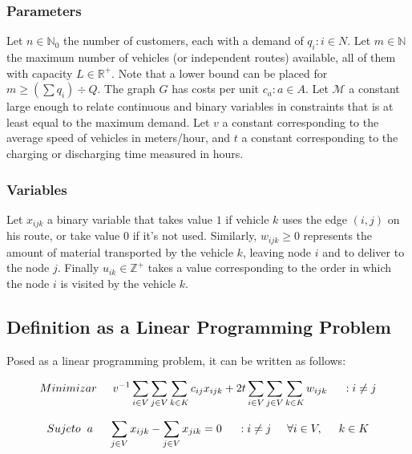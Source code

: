 \documentclass{amsart}
\begin{document}
        \subsubsection{Parameters}
        Let $n \in \mathbb{N}_0$ the number of customers, each with a demand of $q_i : i \in N$. Let $m \in \mathbb{N}$ the maximum number of vehicles (or independent routes) available, all of them with capacity $L \in \mathbb{R}^+$. Note that a lower bound can be placed for $m \geq (\sum q_i) \div Q$. The graph $G$ has costs per unit $c_{a} : a \in A$. Let $\mathcal{M}$ a constant large enough to relate continuous and binary variables in constraints that is at least equal to the maximum demand. Let $v$ a constant corresponding to the average speed of vehicles in meters/hour, and $t$ a constant corresponding to the charging or discharging time measured in hours.

        \subsubsection{Variables}
        Let $x_{ijk}$ a binary variable that takes value $1$ if vehicle $k$ uses the edge $(i, j)$ on his route, or take value $0$ if it's not used. Similarly, $w_{ijk} \geq 0$ represents the amount of material transported by the vehicle $k$, leaving node $i$ and to deliver to the node $j$. Finally $u_{ik} \in \mathbb{Z}^+$ takes a value corresponding to the order in which the node $i$ is visited by the vehicle $k$.

        \subsection{Definition as a Linear Programming Problem}
        Posed as a linear programming problem, it can be written as follows:
            
            \begin{equation}
                Minimizar \hspace{0.5cm} v^{-1} \sum_{i \in V} \sum_{j \in V} \sum_{k \in K} c_{ij} x_{ijk} + 2t \sum_{i \in V} \sum_{j \in V} \sum_{k \in K} w_{ijk} \hspace{0.5cm} : i \neq j
            \end{equation}

        \[Sujeto\hspace{0.2cm} a \hspace{0.5cm} \sum_{j \in V} x_{ijk} - \sum_{j \in V} x_{jik} = 0 \hspace{0.5cm} : i \neq j \hspace{0.5cm} \forall i \in V, \hspace{0.5cm} k \in K\]
\end{document}
